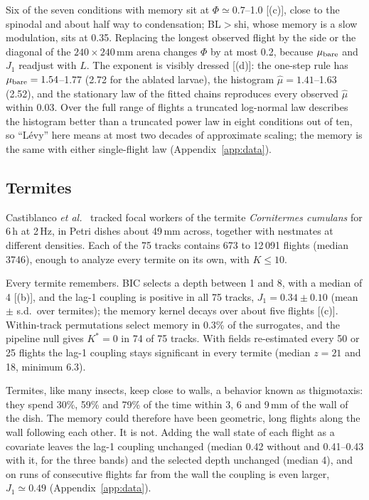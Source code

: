 Six of the seven conditions with memory sit at $\Phi\simeq0.7$--1.0 [(c)], close to the spinodal and about half way to condensation; BL$>$shi, whose memory is a slow modulation, sits at 0.35. Replacing the longest observed flight by the side or the diagonal of the $240\times240$\,mm arena changes $\Phi$ by at most 0.2, because $\mu_{\rm bare}$ and $J_1$ readjust with $L$. The exponent is visibly dressed [(d)]: the one-step rule has $\mu_{\rm bare}=1.54$--1.77 (2.72 for the ablated larvae), the histogram $\hat\mu=1.41$--1.63 (2.52), and the stationary law of the fitted chains reproduces every observed $\hat\mu$ within 0.03. Over the full range of flights a truncated log-normal law describes the histogram better than a truncated power law in eight conditions out of ten, so ``L\'evy'' here means at most two decades of approximate scaling; the memory is the same with either single-flight law (Appendix~\ref{app:data}).

\subsection{Termites}\label{sec:termites}

Castiblanco \emph{et al.}~\cite{Castiblanco2019} tracked focal workers of the termite \emph{Cornitermes cumulans} for 6\,h at 2\,Hz, in Petri dishes about 49\,mm across, together with nestmates at different densities. Each of the 75 tracks contains 673 to 12\,091 flights (median 3746), enough to analyze every termite on its own, with $K\le10$.

Every termite remembers. BIC selects a depth between 1 and 8, with a median of 4 [(b)], and the lag-1 coupling is positive in all 75 tracks, $J_1=0.34\pm0.10$ (mean $\pm$ s.d.\ over termites); the memory kernel decays over about five flights [(c)]. Within-track permutations select memory in 0.3\% of the surrogates, and the pipeline null gives $K^*=0$ in 74 of 75 tracks. With fields re-estimated every 50 or 25 flights the lag-1 coupling stays significant in every termite (median $z=21$ and 18, minimum 6.3).

Termites, like many insects, keep close to walls, a behavior known as thigmotaxis: they spend 30\%, 59\% and 79\% of the time within 3, 6 and 9\,mm of the wall of the dish. The memory could therefore have been geometric, long flights along the wall following each other. It is not. Adding the wall state of each flight as a covariate leaves the lag-1 coupling unchanged (median 0.42 without and 0.41--0.43 with it, for the three bands) and the selected depth unchanged (median 4), and on runs of consecutive flights far from the wall the coupling is even larger, $J_1\simeq0.49$ (Appendix~\ref{app:data}).

